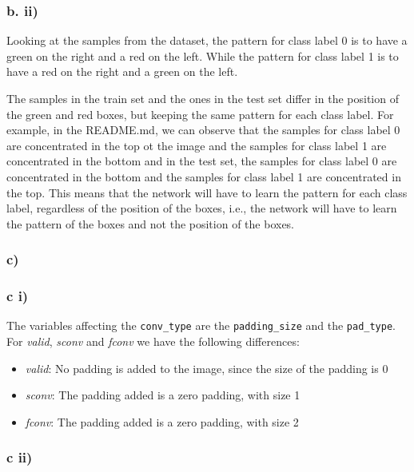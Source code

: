 \documentclass{article}
\begin{document}
\subsubsection*{b. ii)}
Looking at the samples from the dataset, the pattern for class label 0 is to have a green on the right and a red on the left.
While the pattern for class label 1 is to have a red on the right and a green on the left.

The samples in the train set and the ones in the test set differ in the position of the green and red boxes, but
keeping the same pattern for each class label. For example, in the README.md, we can observe that the samples for
class label 0 are concentrated in the top ot the image and the samples for class label 1 are concentrated in the bottom
and in the test set, the samples for class label 0 are concentrated in the bottom and the samples for class label 1 are
concentrated in the top.
This means that the network will have to learn the pattern for each class label, regardless of the position of the boxes, 
i.e., the network will have to learn the pattern of the boxes and not the position of the boxes.

\subsubsection*{c)}

\subsubsection*{c i)}


The variables affecting the \texttt{conv\_type} are the \texttt{padding\_size} and the \texttt{pad\_type}.
For \textit{valid}, \textit{sconv} and \textit{fconv} we have the following differences:

\begin{itemize}
    \item \textit{valid}: No padding is added to the image, since the size of the padding is 0
    \item \textit{sconv}: The padding added is a zero padding, with size 1
    \item \textit{fconv}: The padding added is a zero padding, with size 2
\end{itemize}

\subsubsection*{c ii)}
\end{document}
